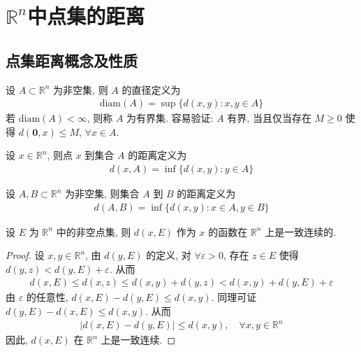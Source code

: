 \documentclass[../../main.tex]{subfiles}
\begin{document}
\section{$\mathbb{R}^n$中点集的距离}

\subsection{点集距离概念及性质}

\begin{definition}
设 $A \subset \mathbb{R}^n$ 为非空集, 则 $A$ 的直径定义为
\begin{align*}
\mathrm{diam}(A) = \sup\{d(x, y) : x, y \in A\}
\end{align*}
若 $\mathrm{diam}(A) < \infty$, 则称 $A$ 为有界集. 容易验证: $A$ 有界, 当且仅当存在 $M \geqslant 0$ 使得 $d(\mathbf{0}, x) \leqslant M$, $\forall x \in A$.

设 $x \in \mathbb{R}^n$, 则点 $x$ 到集合 $A$ 的距离定义为
\begin{align*}
d(x, A) = \inf\{d(x, y) : y \in A\}
\end{align*}

设 $A, B \subset \mathbb{R}^n$ 为非空集, 则集合 $A$ 到 $B$ 的距离定义为
\begin{align*}
d(A, B) = \inf\{d(x, y) : x \in A, y \in B\}
\end{align*}
\end{definition}

\begin{proposition}\label{proposition:点与集合之间的距离函数在R^n上一致连续}
设 $E$ 为 $\mathbb{R}^n$ 中的非空点集, 则 $d(x, E)$ 作为 $x$ 的函数在 $\mathbb{R}^n$ 上是一致连续的.
\end{proposition}
\begin{proof}
设 $x, y \in \mathbb{R}^n$, 由 $d(y, E)$ 的定义, 对 $\forall \varepsilon > 0$, 存在 $z \in E$ 使得 $d(y, z) < d(y, E) + \varepsilon$. 从而
\begin{align*}
d(x, E) \leqslant d(x, z) \leqslant d(x, y) + d(y, z) < d(x, y) + d(y, E) + \varepsilon
\end{align*}
由 $\varepsilon$ 的任意性, $d(x, E) - d(y, E) \leqslant d(x, y)$. 同理可证 $d(y, E) - d(x, E) \leqslant d(x, y)$. 从而
\begin{align*}
|d(x, E) - d(y, E)| \leqslant d(x, y), \quad \forall x, y \in \mathbb{R}^n
\end{align*}
因此, $d(x, E)$ 在 $\mathbb{R}^n$ 上是一致连续.
\end{proof}
\end{document}

